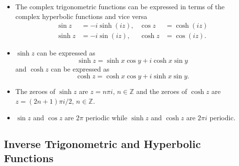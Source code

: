 \documentclass{article}
\begin{document}
\begin{itemize}
  \item The complex trigonometric functions can be expressed in terms of the complex hyperbolic functions and vice versa \begin{align*}
          \sin z  & = -i \sinh (i z), & \cos z  & = \cosh (i z) \\
          \sinh z & = -i \sin (i z),  & \cosh z & = \cos (i z).
        \end{align*}

  \item $\sinh z$ can be expressed as \[\sinh z = \sinh x \cos y + i \cosh x \sin y\] and $\cosh z$ can be expressed as \[\cosh z = \cosh x \cos y + i \sinh x \sin y.\]

  \item The zeroes of $\sinh z$ are $z = n \pi i, \,n \in \mathbb{Z}$ and the zeroes of $\cosh z$ are $z = (2 n + 1) \pi i / 2, \,n \in \mathbb{Z}$.

  \item $\sin z$ and $\cos z$ are $2 \pi$ periodic while $\sinh z$ and $\cosh z$ are $2 \pi i$ periodic.
\end{itemize}

\subsection{Inverse Trigonometric and Hyperbolic Functions}
\end{document}
